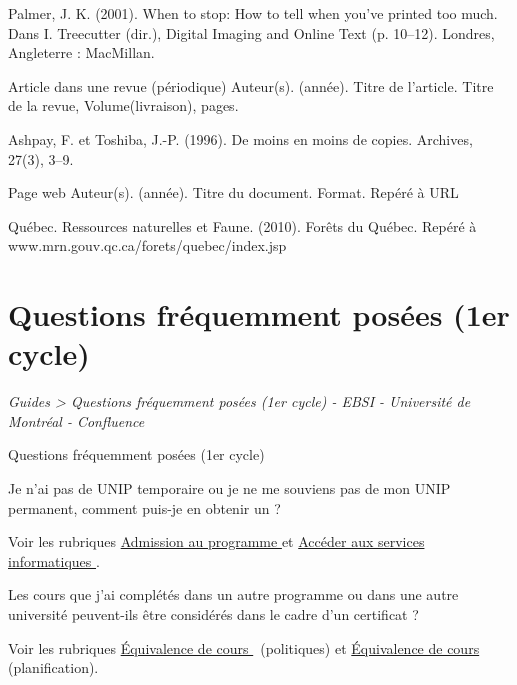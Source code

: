 \documentclass [12 pt]{article}
\begin{document}
                Palmer, J. K. (2001). When to stop: How to tell when you've printed too much.
                    Dans I. Treecutter (dir.), Digital Imaging and Online Text (p. 10–12).
                    Londres, Angleterre : MacMillan.
            
            Article dans une revue (périodique)
            {Auteur(s)}. ({année}). {Titre de l'article}. {Titre de la revue},
                    {Volume}({livraison}), {pages}.
            
                Ashpay, F. et Toshiba, J.-P. (1996). De moins en moins de copies.
                        Archives, 27(3), 3–9.
            
            Page web
            {Auteur(s)}. ({année}). {Titre du document}. {Format}. Repéré à {URL}
            
                Québec. Ressources naturelles et Faune. (2010). Forêts du Québec. Repéré à
                    www.mrn.gouv.qc.ca/forets/quebec/index.jsp
            
        
    
    
        \newpage
        \section {
        Questions fréquemment posées (1er cycle)
        }
        
        
        
        \textit{
        Guides > Questions fréquemment posées (1er cycle) - EBSI - Université de Montréal
            - Confluence
        }
    
        Questions fréquemment posées (1er cycle)
        
            Je n'ai pas de UNIP temporaire ou je ne me souviens pas de mon UNIP permanent,
                comment puis-je en obtenir un ?
            
                Voir les rubriques 
        \href{
        /pages/viewpage.action?pageId=124097765
        } {
        Admission au
                        programme
        }
     et 
        \href{
        /pages/viewpage.action?pageId=124097246
        } {
        Accéder
                        aux services informatiques
        }
    .
            
            Les cours que j'ai complétés dans un autre programme ou dans une autre université
                peuvent-ils être considérés dans le cadre d'un certificat ?
            
                Voir les rubriques 
        \href{
        /pages/viewpage.action?pageId=124097968
        } {
        Équivalence
                        de cours
        }
     (politiques) et 
        \href{
        https://wiki.umontreal.ca/pages/viewpage.action?pageId=124097697#equivalence
        } {
        Équivalence de cours
        }
     (planification).
            
\end{document}
